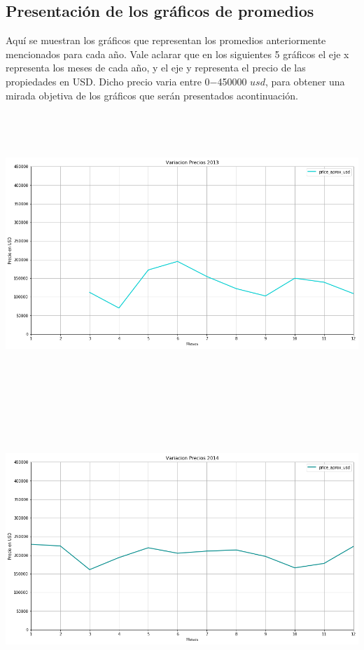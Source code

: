 \documentclass[a4paper, 10pt]{article}
\begin{document}
	      \subsection{Presentación de los gráficos de promedios}
	      	Aquí se muestran los gráficos que representan los promedios anteriormente mencionados para cada año. Vale aclarar que en
	      	los siguientes 5 gráficos el eje x representa los meses de cada año, y el eje y representa el precio de las propiedades
	      	en USD. Dicho precio varia entre 0$-$450000 $usd$, para obtener una mirada objetiva de los gráficos que serán presentados
	      	acontinuación.
			\begin{center}
       			\includegraphics[width=6in, height=4.2in]{images/variacion2013}
		   	\end{center}
        		\begin{center}
       			\includegraphics[width=6in, height=4.2in]{images/variacion2014}
		   	\end{center}
\end{document}

